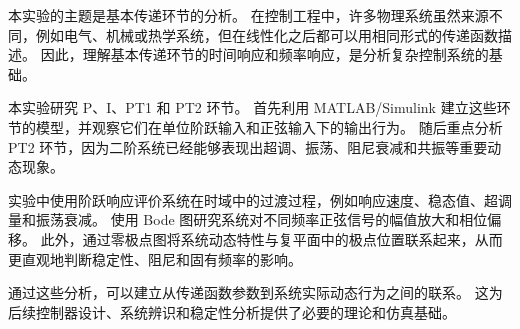 本实验的主题是基本传递环节的分析。
在控制工程中，许多物理系统虽然来源不同，例如电气、机械或热学系统，但在线性化之后都可以用相同形式的传递函数描述。
因此，理解基本传递环节的时间响应和频率响应，是分析复杂控制系统的基础。

本实验研究 P、I、PT1 和 PT2 环节。
首先利用 MATLAB/Simulink 建立这些环节的模型，并观察它们在单位阶跃输入和正弦输入下的输出行为。
随后重点分析 PT2 环节，因为二阶系统已经能够表现出超调、振荡、阻尼衰减和共振等重要动态现象。

实验中使用阶跃响应评价系统在时域中的过渡过程，例如响应速度、稳态值、超调量和振荡衰减。
使用 Bode 图研究系统对不同频率正弦信号的幅值放大和相位偏移。
此外，通过零极点图将系统动态特性与复平面中的极点位置联系起来，从而更直观地判断稳定性、阻尼和固有频率的影响。

通过这些分析，可以建立从传递函数参数到系统实际动态行为之间的联系。
这为后续控制器设计、系统辨识和稳定性分析提供了必要的理论和仿真基础。
